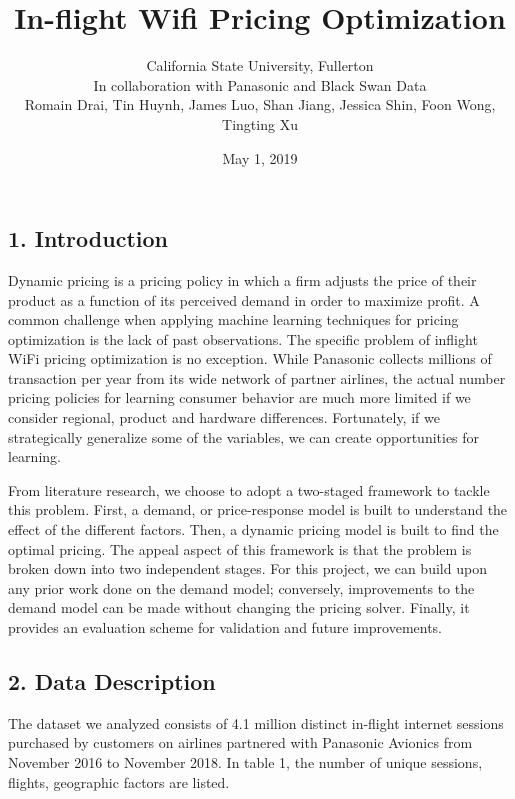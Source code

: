 \documentclass[]{article}
\title{In-flight Wifi Pricing Optimization}
\author{California State University, Fullerton \\ In collaboration with Panasonic and Black Swan Data \\ Romain Drai, Tin Huynh, James Luo, Shan Jiang, Jessica Shin, Foon Wong,
Tingting Xu}
\date{May 1, 2019}
\begin{document}
\maketitle

\hypertarget{introduction}{%
\subsection{1. Introduction}\label{introduction}}

Dynamic pricing is a pricing policy in which a firm adjusts the price of
their product as a function of its perceived demand in order to maximize
profit. A common challenge when applying machine learning techniques for
pricing optimization is the lack of past observations. The specific
problem of inflight WiFi pricing optimization is no exception. While
Panasonic collects millions of transaction per year from its wide
network of partner airlines, the actual number pricing policies for
learning consumer behavior are much more limited if we consider
regional, product and hardware differences. Fortunately, if we
strategically generalize some of the variables, we can create
opportunities for learning.

From literature research, we choose to adopt a two-staged framework to
tackle this problem. First, a demand, or price-response model is built
to understand the effect of the different factors. Then, a dynamic
pricing model is built to find the optimal pricing. The appeal aspect of
this framework is that the problem is broken down into two independent
stages. For this project, we can build upon any prior work done on the
demand model; conversely, improvements to the demand model can be made
without changing the pricing solver. Finally, it provides an evaluation
scheme for validation and future improvements.

\hypertarget{data-description}{%
\subsection{2. Data Description}\label{data-description}}

The dataset we analyzed consists of 4.1 million distinct in-flight
internet sessions purchased by customers on airlines partnered with
Panasonic Avionics from November 2016 to November 2018. In table 1, the
number of unique sessions, flights, geographic factors are listed.
\end{document}
